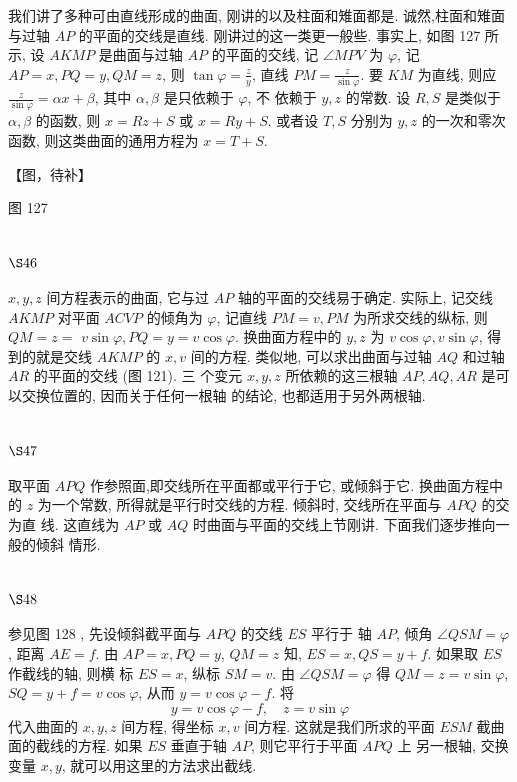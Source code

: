 我们讲了多种可由直线形成的曲面, 刚讲的以及柱面和雉面都是. 诚然,柱面和雉面 与过轴 $A P$ 的平面的交线是直线. 刚讲过的这一类更一般些. 事实上, 如图 127 所示, 设 $A K M P$ 是曲面与过轴 $A P$ 的平面的交线, 记 $\angle M P V$ 为 $\varphi$, 记 $A P=x, P Q=y, Q M=z$, 则 $\tan \varphi=\frac{z}{y}$, 直线 $P M=\frac{z}{\sin \varphi}$. 要 $K M$ 为直线, 则应 $\frac{z}{\sin \varphi}=\alpha x+\beta$, 其中 $\alpha, \beta$ 是只依赖于 $\varphi$, 不 依赖于 $y, z$ 的常数. 设 $R, S$ 是类似于 $\alpha, \beta$ 的函数, 则 $x=R z+S$ 或 $x=R y+S$. 或者设 $T, S$ 分别为 $y, z$ 的一次和零次函数, 则这类曲面的通用方程为 $x=T+S$.


【图，待补】

图 127

\section{$\S 46$}

$x, y, z$ 间方程表示的曲面, 它与过 $A P$ 轴的平面的交线易于确定. 实际上, 记交线 $A K M P$ 对平面 $A C V P$ 的倾角为 $\varphi$, 记直线 $P M=v, P M$ 为所求交线的纵标, 则 $Q M=z=$ $v \sin \varphi, P Q=y=v \cos \varphi$. 换曲面方程中的 $y, z$ 为 $v \cos \varphi, v \sin \varphi$, 得到的就是交线 $A K M P$ 的 $x, v$ 间的方程. 类似地, 可以求出曲面与过轴 $A Q$ 和过轴 $A R$ 的平面的交线 (图 121). 三 个变元 $x, y, z$ 所依赖的这三根轴 $A P, A Q, A R$ 是可以交换位置的, 因而关于任何一根轴 的结论, 也都适用于另外两根轴.

\section{$\S 47$}

取平面 $A P Q$ 作参照面,即交线所在平面都或平行于它, 或倾斜于它. 换曲面方程中 的 $z$ 为一个常数, 所得就是平行时交线的方程. 倾斜时, 交线所在平面与 $A P Q$ 的交为直 线. 这直线为 $A P$ 或 $A Q$ 时曲面与平面的交线上节刚讲. 下面我们逐步推向一般的倾斜 情形.

\section{$\S 48$}

参见图 128 , 先设倾斜截平面与 $A P Q$ 的交线 $E S$ 平行于 轴 $A P$, 倾角 $\angle Q S M=\varphi$, 距离 $A E=f$. 由 $A P=x, P Q=y$, $Q M=z$ 知, $E S=x, Q S=y+f$. 如果取 $E S$ 作截线的轴, 则横 标 $E S=x$, 纵标 $S M=v$. 由 $\angle Q S M=\varphi$ 得 $Q M=z=v \sin \varphi$, $S Q=y+f=v \cos \varphi$, 从而 $y=v \cos \varphi-f$. 将
\[
y=v \cos \varphi-f, \quad z=v \sin \varphi
\]
代入曲面的 $x, y, z$ 间方程, 得坐标 $x, v$ 间方程. 这就是我们所求的平面 $E S M$ 截曲面的截线的方程. 如果 $E S$ 垂直于轴 $A P$, 则它平行于平面 $A P Q$ 上 另一根轴, 交换变量 $x, y$, 就可以用这里的方法求出截线.


